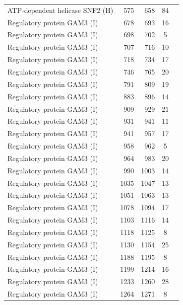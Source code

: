\begin{longtable}{@{}p{7.5cm}rrrl@{}}
  ATP-dependent helicase SNF2 (H) & 575 & 658 & \multicolumn{1}{c}{84} \\
  Regulatory protein GAM3 (I) & 678 & 693 & \multicolumn{1}{c}{16} \\
  Regulatory protein GAM3 (I) & 698 & 702 & \multicolumn{1}{c}{5} \\
  Regulatory protein GAM3 (I) & 707 & 716 & \multicolumn{1}{c}{10} \\
  Regulatory protein GAM3 (I) & 718 & 734 & \multicolumn{1}{c}{17} \\
  Regulatory protein GAM3 (I) & 746 & 765 & \multicolumn{1}{c}{20} \\
  Regulatory protein GAM3 (I) & 791 & 809 & \multicolumn{1}{c}{19} \\
  Regulatory protein GAM3 (I) & 883 & 896 & \multicolumn{1}{c}{14} \\
  Regulatory protein GAM3 (I) & 909 & 929 & \multicolumn{1}{c}{21} \\
  Regulatory protein GAM3 (I) & 931 & 941 & \multicolumn{1}{c}{11} \\
  Regulatory protein GAM3 (I) & 941 & 957 & \multicolumn{1}{c}{17} \\
  Regulatory protein GAM3 (I) & 958 & 962 & \multicolumn{1}{c}{5} \\
  Regulatory protein GAM3 (I) & 964 & 983 & \multicolumn{1}{c}{20} \\
  Regulatory protein GAM3 (I) & 990 & 1003 & \multicolumn{1}{c}{14} \\
  Regulatory protein GAM3 (I) & 1035 & 1047 & \multicolumn{1}{c}{13} \\
  Regulatory protein GAM3 (I) & 1051 & 1063 & \multicolumn{1}{c}{13} \\
  Regulatory protein GAM3 (I) & 1078 & 1094 & \multicolumn{1}{c}{17} \\
  Regulatory protein GAM3 (I) & 1103 & 1116 & \multicolumn{1}{c}{14} \\
  Regulatory protein GAM3 (I) & 1118 & 1125 & \multicolumn{1}{c}{8} \\
  Regulatory protein GAM3 (I) & 1130 & 1154 & \multicolumn{1}{c}{25} \\
  Regulatory protein GAM3 (I) & 1188 & 1195 & \multicolumn{1}{c}{8} \\
  Regulatory protein GAM3 (I) & 1199 & 1214 & \multicolumn{1}{c}{16} \\
  Regulatory protein GAM3 (I) & 1233 & 1260 & \multicolumn{1}{c}{28} \\
  Regulatory protein GAM3 (I) & 1264 & 1271 & \multicolumn{1}{c}{8} \\

\end{longtable}
